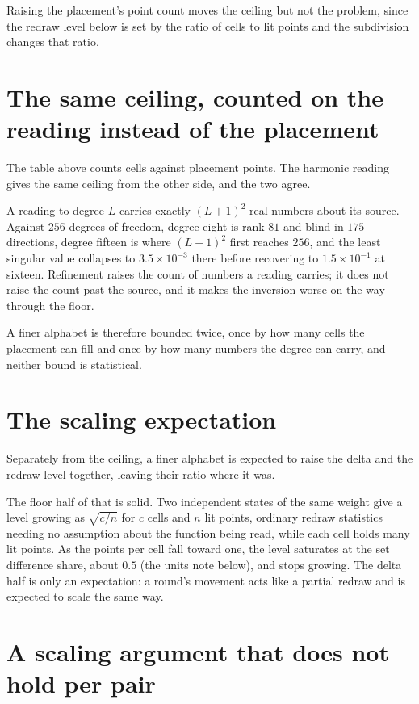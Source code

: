 Raising the placement's point count moves the ceiling but not the problem, since the redraw level below is set by the ratio of cells to lit points and the subdivision changes that ratio.

\section{The same ceiling, counted on the reading instead of the placement}

The table above counts cells against placement points. The harmonic reading gives the same ceiling from the other side, and the two agree.

A reading to degree \(L\) carries exactly \((L+1)^2\) real numbers about its source. Against \(256\) degrees of freedom, degree eight is rank \(81\) and blind in \(175\) directions, degree fifteen is where \((L+1)^2\) first reaches \(256\), and the least singular value collapses to \(3.5 \times 10^{-3}\) there before recovering to \(1.5 \times 10^{-1}\) at sixteen. Refinement raises the count of numbers a reading carries; it does not raise the count past the source, and it makes the inversion worse on the way through the floor.

A finer alphabet is therefore bounded twice, once by how many cells the placement can fill and once by how many numbers the degree can carry, and neither bound is statistical.

\section{The scaling expectation}

Separately from the ceiling, a finer alphabet is expected to raise the delta and the redraw level together, leaving their ratio where it was.

The floor half of that is solid. Two independent states of the same weight give a level growing as \(\sqrt{c/n}\) for \(c\) cells and \(n\) lit points, ordinary redraw statistics needing no assumption about the function being read, while each cell holds many lit points. As the points per cell fall toward one, the level saturates at the set difference share, about \(0.5\) (the units note below), and stops growing. The delta half is only an expectation: a round's movement acts like a partial redraw and is expected to scale the same way.

\section{A scaling argument that does not hold per pair}


